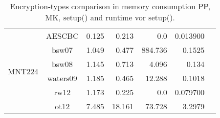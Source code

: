 \documentclass[twoside,11pt,titlepage,a4paper,english,bibliography=totocnumbered,listof=numbered]{scrbook}
\begin{document}
\begin{table}[ht]
{\begin{tabular}{|c|c|r|r|r|r|r|}
\cline{2-6}
\hline
\hline
\multirow{6}{*}{MNT224}& AESCBC&    0.125    &    0.213    &    0.0      &    0.013900  \\
\cline{2-6}
& bsw07&    1.049    &    0.477    &  884.736    &    0.1525    \\
\cline{2-6}
& bsw08&    1.145    &    0.713    &    4.096    &    0.134     \\
\cline{2-6}
& waters09&    1.185    &    0.465    &   12.288    &    0.1018    \\
\cline{2-6}
& rw12&    1.173    &    0.225    &    0.0      &    0.079700  \\
\cline{2-6}
& ot12&    7.485    &   18.161    &   73.728    &    3.2979    \\
\cline{2-6}
\hline
\end{tabular}}\caption{Encryption-types comparison in memory consumption PP, MK, setup() and runtime vor setup().}\label{table:abe_setup} \end{table} 
\end{document}
